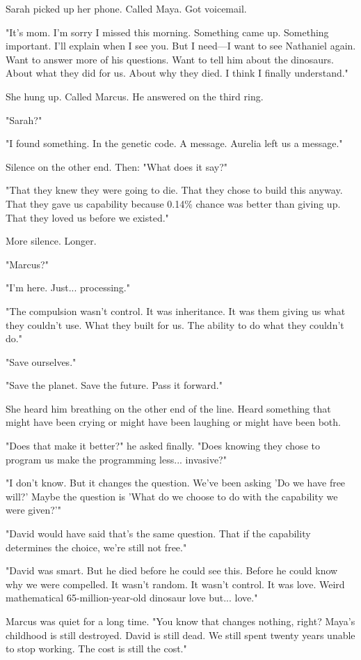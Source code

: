 Sarah picked up her phone. Called Maya. Got voicemail.

"It's mom. I'm sorry I missed this morning. Something came up. Something important. I'll explain when I see you. But I need—I want to see Nathaniel again. Want to answer more of his questions. Want to tell him about the dinosaurs. About what they did for us. About why they died. I think I finally understand."

She hung up. Called Marcus. He answered on the third ring.

"Sarah?"

"I found something. In the genetic code. A message. Aurelia left us a message."

Silence on the other end. Then: "What does it say?"

"That they knew they were going to die. That they chose to build this anyway. That they gave us capability because 0.14\% chance was better than giving up. That they loved us before we existed."

More silence. Longer.

"Marcus?"

"I'm here. Just... processing."

"The compulsion wasn't control. It was inheritance. It was them giving us what they couldn't use. What they built for us. The ability to do what they couldn't do."

"Save ourselves."

"Save the planet. Save the future. Pass it forward."

She heard him breathing on the other end of the line. Heard something that might have been crying or might have been laughing or might have been both.

"Does that make it better?" he asked finally. "Does knowing they chose to program us make the programming less... invasive?"

"I don't know. But it changes the question. We've been asking 'Do we have free will?' Maybe the question is 'What do we choose to do with the capability we were given?'"

"David would have said that's the same question. That if the capability determines the choice, we're still not free."

"David was smart. But he died before he could see this. Before he could know why we were compelled. It wasn't random. It wasn't control. It was love. Weird mathematical 65-million-year-old dinosaur love but... love."

Marcus was quiet for a long time. "You know that changes nothing, right? Maya's childhood is still destroyed. David is still dead. We still spent twenty years unable to stop working. The cost is still the cost."

